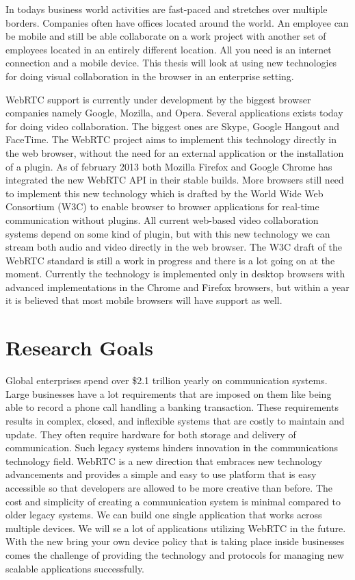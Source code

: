 
In todays business world activities are fast-paced and stretches over multiple borders. Companies often have offices located around the world. An employee can be mobile and still be able collaborate on a work project with another set of employees located in an entirely different location. All you need is an internet connection and a mobile device. This thesis will look at using new technologies for doing visual collaboration in the browser in an enterprise setting.

WebRTC support is currently under development by the biggest browser companies namely Google, Mozilla, and Opera. Several applications exists today for doing video collaboration. The biggest ones are Skype, Google Hangout and FaceTime. The WebRTC project aims to implement this technology directly in the web browser, without the need for an external application or the installation of a plugin. As of february 2013 both Mozilla Firefox and Google Chrome has integrated the new WebRTC API in their stable builds. More browsers still need to implement this new technology which is drafted by the World Wide Web Consortium (W3C) to enable browser to browser applications for real-time communication without plugins. All current web-based video collaboration systems depend on some kind of plugin, but with this new technology we can stream both audio and video directly in the web browser. The W3C draft of the WebRTC standard is still a work in progress and there is a lot going on at the moment. Currently the technology is implemented only in desktop browsers with advanced implementations in the Chrome and Firefox browsers, but within a year it is believed that most mobile browsers will have support as well.

\section{Research Goals}
Global enterprises spend over \$2.1 trillion yearly on communication systems. Large businesses have a lot requirements that are imposed on them like being able to record a phone call handling a banking transaction. These requirements results in complex, closed, and inflexible systems that are costly to maintain and update. They often require hardware for both storage and delivery of communication. Such legacy systems hinders innovation in the communications technology field. WebRTC is a new direction that embraces new technology advancements and provides a simple and easy to use platform that is easy accessible so that developers are allowed to be more creative than before. The cost and simplicity of creating a communication system is minimal compared to older legacy systems. We can build one single application that works across multiple devices. We will se a lot of applications utilizing WebRTC in the future. With the new bring your own device policy that is taking place inside businesses comes the challenge of providing the technology and protocols for managing new scalable applications successfully.

